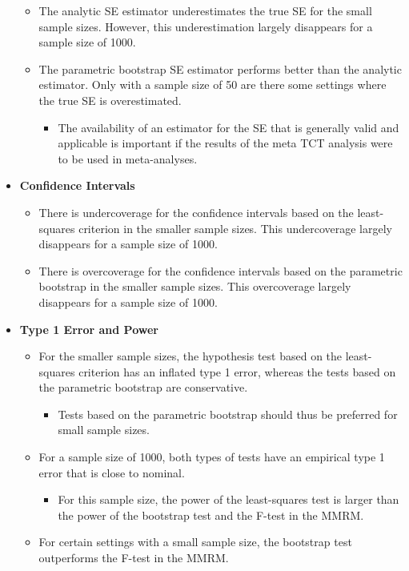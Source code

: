 \documentclass[
]{article}
\providecommand{\tightlist}{%
  \setlength{\itemsep}{0pt}\setlength{\parskip}{0pt}}
\begin{document}
\begin{itemize}
  \begin{itemize}
  \tightlist
  \item
    The analytic SE estimator underestimates the true SE for the small sample
    sizes. However, this underestimation largely disappears for a sample size of 1000.
  \item
    The parametric bootstrap SE estimator performs better than the
    analytic estimator. Only with a sample size of 50 are there some settings
    where the true SE is overestimated.

    \begin{itemize}
    \tightlist
    \item
      The availability of an estimator for the SE that is generally valid and
      applicable is important if the results of the meta TCT analysis were to be
      used in meta-analyses.
    \end{itemize}
  \end{itemize}
\item
  \textbf{Confidence Intervals}

  \begin{itemize}
  \tightlist
  \item
    There is undercoverage for the confidence intervals based on the least-squares criterion
    in the smaller sample sizes. This undercoverage largely disappears for a sample
    size of 1000.
  \item
    There is overcoverage for the confidence intervals based on the parametric
    bootstrap in the smaller sample sizes. This overcoverage largely disappears for
    a sample size of 1000.
  \end{itemize}
\item
  \textbf{Type 1 Error and Power}

  \begin{itemize}
  \tightlist
  \item
    For the smaller sample sizes, the hypothesis test based on the least-squares
    criterion has an inflated type 1 error, whereas the tests based on the parametric
    bootstrap are conservative.

    \begin{itemize}
    \tightlist
    \item
      Tests based on the parametric bootstrap should thus be preferred for small
      sample sizes.
    \end{itemize}
  \item
    For a sample size of 1000, both types of tests have an empirical type 1 error
    that is close to nominal.

    \begin{itemize}
    \tightlist
    \item
      For this sample size, the power of the least-squares test is larger than
      the power of the bootstrap test and the F-test in the MMRM.
    \end{itemize}
  \item
    For certain settings with a small sample size, the bootstrap test
    outperforms the F-test in the MMRM.
  \end{itemize}
\end{itemize}
\end{document}
